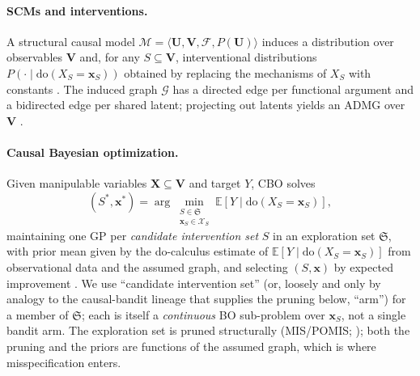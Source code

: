 \documentclass{article}
\newcommand{\E}{\mathbb{E}}
\renewcommand{\do}{\mathrm{do}}
\newcommand{\Gg}{\mathcal{G}}
\begin{document}
\paragraph{SCMs and interventions.}
A structural causal model $\mathcal{M}=\langle
\mathbf{U},\mathbf{V},\mathcal{F},P(\mathbf{U})\rangle$ induces a
distribution over observables $\mathbf{V}$ and, for any $S \subseteq
\mathbf{V}$, interventional distributions $P(\cdot \mid \do(X_S =
\mathbf{x}_S))$ obtained by replacing the mechanisms of $X_S$ with
constants \citep{pearl2009causality}. The induced graph $\Gg$ has a
directed edge per functional argument and a bidirected edge per shared
latent; projecting out latents yields an ADMG over $\mathbf{V}$
\citep{lee2019latent}.

\paragraph{Causal Bayesian optimization.}
Given manipulable variables $\mathbf{X} \subseteq \mathbf{V}$ and target
$Y$, CBO \citep{aglietti2020causal} solves
\begin{equation}
  \label{eq:cbo_obj}
  (S^*, \mathbf{x}^*) = \arg\min_{\substack{S \in \mathfrak{S} \\ \mathbf{x}_S \in \mathcal{X}_S}}
  \E\!\left[Y \mid \do(X_S = \mathbf{x}_S)\right],
\end{equation}
maintaining one GP per \emph{candidate intervention set} $S$ in an exploration
set $\mathfrak{S}$, with prior mean given by the do-calculus estimate of
$\E[Y \mid \do(X_S=\mathbf{x}_S)]$ from observational data and the assumed
graph, and selecting $(S,\mathbf{x})$ by expected improvement
\citep{garnett2023bayesian}. We use ``candidate intervention set'' (or, loosely
and only by analogy to the causal-bandit lineage that supplies the pruning
below, ``arm'') for a member of $\mathfrak{S}$; each is itself a
\emph{continuous} BO sub-problem over $\mathbf{x}_S$, not a single bandit arm.
The exploration set is pruned structurally (MIS/POMIS;
\citealp{lee2018structural}); both the pruning and the priors are functions of
the assumed graph, which is where misspecification enters.
\end{document}
